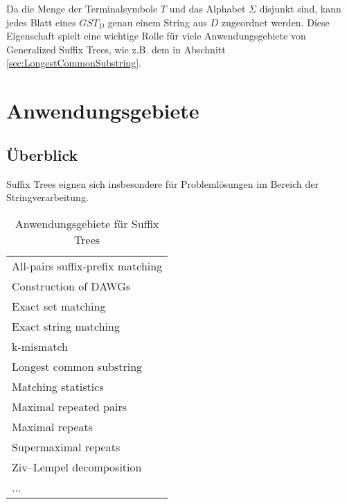 \documentclass[12pt]{report}
\begin{document}
Da die Menge der Terminalsymbole $T$ und das Alphabet $\Sigma$ disjunkt sind, kann jedes Blatt eines $GST_D$ genau einem String aus $D$ zugeordnet werden. Diese Eigenschaft spielt eine wichtige Rolle für viele Anwendungsgebiete von Generalized Suffix Trees, wie z.B. dem in Abschnitt \ref{sec:LongestCommonSubstring}.

\section{Anwendungsgebiete}
\label{sec:Anwendungsgebiete}

\subsection{Überblick}
\label{sec:Ueberblick}

Suffix Trees eignen sich insbesondere für Problemlösungen im Bereich der Stringverarbeitung.

\begin{table}
\centering
\begin{tabular}{l}
    \toprule
    All-pairs suffix-prefix matching      \\
    Construction of DAWGs                 \\
    Exact set matching                    \\
    Exact string matching                 \\
    k-mismatch                            \\
    Longest common substring              \\
    Matching statistics                   \\
    Maximal repeated pairs                \\
    Maximal repeats                       \\
    Supermaximal repeats                  \\
    Ziv–Lempel decomposition              \\
    ...                                   \\
    \bottomrule
\end{tabular}
\caption{Anwendungsgebiete für Suffix Trees}
\label{tab:AnwendungsgebieteFuerSuffixTrees}
\end{table}
\end{document}
